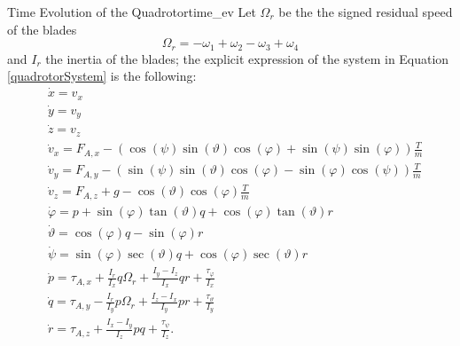 \documentclass[10pt, a4paper]{report}
\begin{document}
\begin{boxdefinition}{Time Evolution of the Quadrotor}{time_ev}
Let $\Omega_r$ be the the signed residual speed of the blades
$$
\Omega_r=-\omega_1+\omega_2-\omega_3+\omega_4
$$
and $I_r$ the inertia of the blades; the explicit expression of the system in Equation \eqref{quadrotorSystem} is the following:
\begin{align}
& \dot{x} = v_x \\
& \dot{y} = v_y \\
& \dot{z} = v_z \\
& \dot{v}_x = F_{A,x} - (\cos(\psi) \sin(\vartheta) \cos(\varphi) + \sin(\psi) \sin(\varphi)) \frac{T}{m} \\
& \dot{v}_y = F_{A,y} - (\sin(\psi) \sin(\vartheta) \cos(\varphi) - \sin(\varphi) \cos(\psi)) \frac{T}{m} \\
& \dot{v}_z = F_{A,z} + g - \cos(\vartheta) \cos(\varphi) \frac{T}{m} \\
& \dot{\varphi} = p + \sin(\varphi) \tan(\vartheta) q + \cos(\varphi) \tan(\vartheta) r \\
& \dot{\vartheta} = \cos(\varphi) q - \sin(\varphi) r \\
& \dot{\psi} = \sin(\varphi) \sec(\vartheta) q + \cos(\varphi) \sec(\vartheta) r \\
& \dot{p} = \tau_{A,x} + \frac{I_r}{I_x} q \Omega_r + \frac{I_y - I_z}{I_x} q r + \frac{\tau_\varphi}{I_x} \\
& \dot{q} = \tau_{A,y} - \frac{I_r}{I_y} p \Omega_r + \frac{I_z - I_x}{I_y} p r + \frac{\tau_\vartheta}{I_y} \\
& \dot{r} = \tau_{A,z} + \frac{I_x - I_y}{I_z} p q + \frac{\tau_\psi}{I_z}.
\end{align}
\end{boxdefinition}
\end{document}
